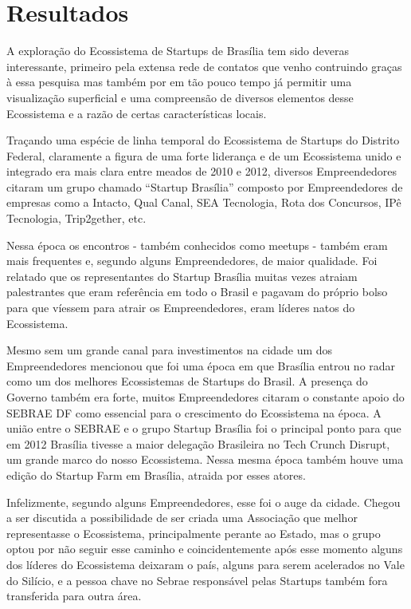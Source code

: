 \chapter[Resultados]{Resultados}
\label{cap-resultados}

A exploração do Ecossistema de Startups de Brasília tem sido deveras interessante, primeiro pela extensa rede de contatos que venho contruindo graças à essa pesquisa mas também por em tão pouco tempo já permitir uma visualização superficial e uma compreensão de diversos elementos desse Ecossistema e a razão de certas características locais.

Traçando uma espécie de linha temporal do Ecossistema de Startups do Distrito Federal, claramente a figura de uma forte liderança e de um Ecossistema unido e integrado era mais clara entre meados de 2010 e 2012, diversos Empreendedores citaram um grupo chamado ``Startup Brasília'' composto por Empreendedores de empresas como a Intacto, Qual Canal, SEA Tecnologia, Rota dos Concursos, IPê Tecnologia, Trip2gether, etc. 

Nessa época os encontros - também conhecidos como meetups - também eram mais frequentes e, segundo alguns Empreendedores, de maior qualidade. Foi relatado que os representantes do Startup Brasília muitas vezes atraiam palestrantes que eram referência em todo o Brasil e pagavam do próprio bolso para que víessem para atrair os Empreendedores, eram líderes natos do Ecossistema.

Mesmo sem um grande canal para investimentos na cidade um dos Empreendedores mencionou que foi uma época em que Brasília entrou no radar como um dos melhores Ecossistemas de Startups do Brasil. A presença do Governo também era forte, muitos Empreendedores citaram o constante apoio do SEBRAE DF como essencial para o crescimento do Ecossistema na época. A união entre o SEBRAE e o grupo Startup Brasília foi o principal ponto para que em 2012 Brasília tivesse a maior delegação Brasileira no Tech Crunch Disrupt, um grande marco do nosso Ecossistema. Nessa mesma época também houve uma edição do Startup Farm em Brasília, atraida por esses atores.

Infelizmente, segundo alguns Empreendedores, esse foi o auge da cidade. Chegou a ser discutida a possibilidade de ser criada uma Associação que melhor representasse o Ecossistema, principalmente perante ao Estado, mas o grupo optou por não seguir esse caminho e coincidentemente após esse momento alguns dos líderes do Ecossistema deixaram o país, alguns para serem acelerados no Vale do Silício, e a pessoa chave no Sebrae responsável pelas Startups também fora transferida para outra área. 


